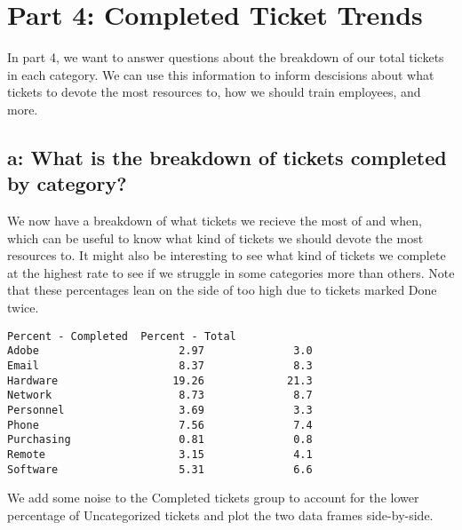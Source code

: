 \documentclass[11pt]{article}
\begin{document}
    \hypertarget{part-4-completed-ticket-trends}{%
\section{Part 4: Completed Ticket
Trends}\label{part-4-completed-ticket-trends}}

In part 4, we want to answer questions about the breakdown of our total
tickets in each category. We can use this information to inform
descisions about what tickets to devote the most resources to, how we
should train employees, and more.

\hypertarget{a-what-is-the-breakdown-of-tickets-completed-by-category}{%
\subsection{a: What is the breakdown of tickets completed by
category?}\label{a-what-is-the-breakdown-of-tickets-completed-by-category}}

    We now have a breakdown of what tickets we recieve the most of and when,
which can be useful to know what kind of tickets we should devote the
most resources to. It might also be interesting to see what kind of
tickets we complete at the highest rate to see if we struggle in some
categories more than others. Note that these percentages lean on the
side of too high due to tickets marked Done twice.


    \begin{Verbatim}[commandchars=\\\{\}]
            Percent - Completed  Percent - Total
Adobe                      2.97              3.0
Email                      8.37              8.3
Hardware                  19.26             21.3
Network                    8.73              8.7
Personnel                  3.69              3.3
Phone                      7.56              7.4
Purchasing                 0.81              0.8
Remote                     3.15              4.1
Software                   5.31              6.6

    \end{Verbatim}

    We add some noise to the Completed tickets group to account for the
lower percentage of Uncategorized tickets and plot the two data frames
side-by-side.

    \begin{center}
    \end{center}
    { \hspace*{\fill} \\}
    
\end{document}
